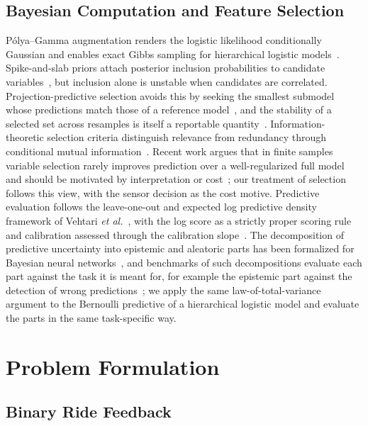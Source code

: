 \documentclass[lettersize,journal]{IEEEtran}
\begin{document}
\subsection{Bayesian Computation and Feature Selection}

P\'{o}lya--Gamma augmentation renders the logistic likelihood conditionally Gaussian and enables exact Gibbs sampling for hierarchical logistic models~\cite{polson2013pg}. Spike-and-slab priors attach posterior inclusion probabilities to candidate variables~\cite{george1993spike}, but inclusion alone is unstable when candidates are correlated. Projection-predictive selection avoids this by seeking the smallest submodel whose predictions match those of a reference model~\cite{piironen2020projective}, and the stability of a selected set across resamples is itself a reportable quantity~\cite{nogueira2018stability}. Information-theoretic selection criteria distinguish relevance from redundancy through conditional mutual information~\cite{brown2012conditional}. Recent work argues that in finite samples variable selection rarely improves prediction over a well-regularized full model and should be motivated by interpretation or cost~\cite{riha2026selection}; our treatment of selection follows this view, with the sensor decision as the cost motive. Predictive evaluation follows the leave-one-out and expected log predictive density framework of Vehtari \emph{et al.}~\cite{vehtari2017loo}, with the log score as a strictly proper scoring rule~\cite{gneiting2007strictly} and calibration assessed through the calibration slope~\cite{vancalster2019calibration}. The decomposition of predictive uncertainty into epistemic and aleatoric parts has been formalized for Bayesian neural networks~\cite{kendall2017uncertainties,depeweg2018decomposition}, and benchmarks of such decompositions evaluate each part against the task it is meant for, for example the epistemic part against the detection of wrong predictions~\cite{mucsanyi2024benchmarking}; we apply the same law-of-total-variance argument to the Bernoulli predictive of a hierarchical logistic model and evaluate the parts in the same task-specific way.

\section{Problem Formulation}
\label{sec:problem}

\subsection{Binary Ride Feedback}
\end{document}
